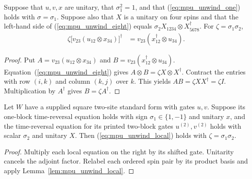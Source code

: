 \begin{lemma}
    \label{lem:mpu_unwind_local}
    \leanok
    Suppose that $u,v,x$ are unitary, that $\sigma_1^2=1$, and that
    (\ref{eq:mpu_unwind_one}) holds with $\sigma=\sigma_1$.
    Suppose also that $X$ is a unitary on four spins and that the
    left-hand side of (\ref{eq:mpu_unwind_eight}) equals
    $\sigma_2 X_{1234}\otimes X_{5678}^{\dagger}$.
    For $\zeta=\sigma_1\sigma_2$,
    \begin{align}
        \zeta\bigl[v_{23}(u_{12}\otimes x_{34})\bigr]^{\dagger}
         & =v_{23}(x_{12}^{\dagger}\otimes u_{34}).
        \label{eq:mpu_unwind_local}
    \end{align}
\end{lemma}
\begin{proof}\leanok
    Put $A=v_{23}(u_{12}\otimes x_{34})$ and
    $B=v_{23}(x_{12}^{\dagger}\otimes u_{34})$.
    Equation~(\ref{eq:mpu_unwind_eight}) gives
    $A\otimes B=\zeta X\otimes X^{\dagger}$.
    Contract the entries with row $(i,k)$ and column $(k,j)$ over $k$.
    This yields $AB=\zeta XX^{\dagger}=\zeta I$.
    Multiplication by $A^{\dagger}$ gives $B=\zeta A^{\dagger}$.
\end{proof}

\begin{lemma}
    \label{lem:mpu_unwind_supplied}
    \leanok
    Let $W$ have a supplied square two-site standard form with gates $u,v$.
    Suppose its one-block time-reversal equation holds with sign
    $\sigma_1\in\{1,-1\}$ and unitary $x$, and the time-reversal equation
    for its printed two-block gates $u^{(2)},v^{(2)}$ holds with scalar
    $\sigma_2$ and unitary $X$. Then (\ref{eq:mpu_unwind_local}) holds
    with $\zeta=\sigma_1\sigma_2$.
\end{lemma}
\begin{proof}\leanok
    Multiply each local equation on the right by its shifted gate.
    Unitarity cancels the adjoint factor. Relabel each ordered spin pair
    by its product basis and apply Lemma~\ref{lem:mpu_unwind_local}.
\end{proof}

